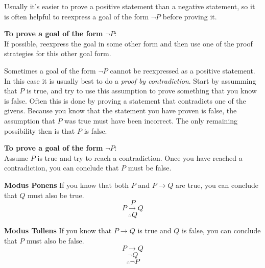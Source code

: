 Usually it's easier to prove a positive statement than a negative statement, so it is often helpful to reexpress a goal of the form $\lnot P$ before proving it.

\textbf{To prove a goal of the form} $\lnot P$:\\
If possible, reexpress the goal in some other form and then use one of the proof strategies for this other goal form.

Sometimes a goal of the form $\lnot P$ cannot be reexpressed as a positive statement. In this case it is usually best to do a \textit{proof by contradiction}. Start by assumming that $P$ is true, and try to use this assumption to prove something that you know is false. Often this is done by proving a statement that contradicts one of the givens. Because you know that the statement you have proven is false, the assumption that $P$ was true must have been incorrect. The only remaining possibility then is that $P$ is false.

\textbf{To prove a goal of the form} $\lnot P$:\\
Assume $P$ is true and try to reach a contradiction. Once you have reached a contradiction, you can conclude that $P$ must be false.

\textbf{Modus Ponens} If you know that both $P$ and $P \rightarrow Q$ are true, you can conclude that $Q$ must also be true.
\[P\]
\[P \rightarrow Q\]
\[\therefore Q\]

\textbf{Modus Tollens} If you know that $P \rightarrow Q$ is true and $Q$ is false, you can conclude that $P$ must also be false.
\[P \rightarrow Q\]
\[\lnot Q\]
\[\therefore \lnot P\]